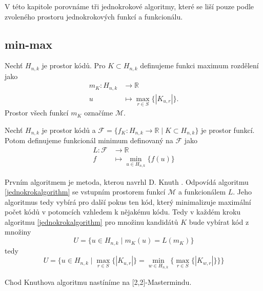 V této kapitole porovnáme tři jednokrokové algoritmy, které se liší pouze podle zvoleného prostoru jednokrokových funkcí a funkcionálu. 

\subsection{min-max}
\begin{definice}
    Nechť $H_{n,k}$ je prostor kódů. Pro $K \subset H_{n,k}$ definujeme funkci maximum rozdělení jako
    \begin{align*}
        m_K \colon H_{n,k} &\to \mathbb{R} \\
        u &\mapsto \max_{r\in S}\{|K_{u,r}|\}.
    \end{align*}
    Prostor všech funkcí $m_K$ označíme $\mathcal{M}$. 
\end{definice}

\begin{definice}
    Nechť $H_{n,k}$ je prostor kódů a $\mathcal{F} = \{f_K\colon H_{n,k} \to \mathbb{R} \mid K \subset H_{n,k}\}$ je prostor funkcí. Potom definujeme funkcionál minimum definovaný na $\mathcal{F}$ jako
    \begin{align*}
        L \colon \mathcal{F} &\to \mathbb{R} \\
        f &\mapsto \min_{u\in H_{n,k}}\{f(u)\}
    \end{align*}
\end{definice}

Prvním algoritmem je metoda, kterou navrhl D. Knuth \cite{donald_e__knuth_1977}. Odpovídá algoritmu \ref{jednokrokalgorithm} se vstupním prostorem funkcí $\mathcal{M}$ a funkcionálem $L$. Jeho algoritmus tedy vybírá pro další pokus ten kód, který minimalizuje maximální počet kódů v potomcích vzhledem k nějakému kódu. Tedy v každém kroku algoritmu \ref{jednokrokalgorithm} pro množinu kandidátů $K$ bude vybírat kód z množiny 
\[U = \{u \in H_{n,k} \mid m_K(u) = L(m_K)\}\]
tedy
\[U = \{u \in H_{n,k} \mid \max_{r\in S}\{|K_{u,r}| \} = \min_{w \in H_{n,k}}\{\max_{r\in S}\{|K_{w,r}|\} \} \}\]



Chod Knuthova algoritmu nastíníme na [2,2]-Mastermindu. 

